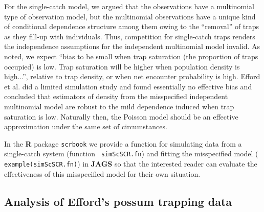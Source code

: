 For the single-catch model, we argued that the observations  
have a multinomial type of observation model, but the
multinomial observations have a unique kind of conditional dependence
structure among them owing to the ``removal'' of traps as they fill-up
with individuals. 
Thus, 
competition for single-catch traps renders the independence
assumptions for the independent multinomial model invalid.  As
\citet{efford_etal:2009euring} noted, we expect ``bias to be small
when trap saturation (the proportion of traps occupied) is low.  Trap
saturation will be higher when population density is high...'',
relative to trap density, or when net encounter probability is high.
Efford et al. did a limited simulation study and found essentially no
effective bias and concluded that estimators of density from the
misspecified independent multinomial model are robust to the mild
dependence induced when trap saturation is low.  Naturally then, the
Poisson model should be an effective approximation under the same set
of circumstances.

In the {\bf R} package \mbox{\tt scrbook} we provide a function for
simulating data from a single-catch system (function \mbox{\tt
  simScSCR.fn}) and fitting the misspecified model (\mbox{\tt
  example(simScSCR.fn)}) in {\bf JAGS} so that the interested reader can
evaluate the effectiveness of this misspecified model for their own
situation.


\subsection{Analysis of Efford's possum trapping data}


